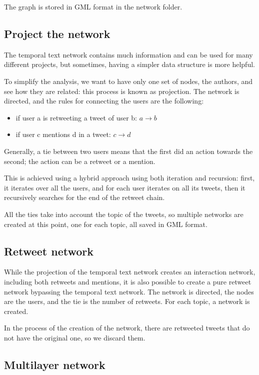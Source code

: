 The graph is stored in GML format in the network folder.

\subsection{Project the network}
The temporal text network contains much information and can be used for many different projects, but sometimes, having a simpler data structure is more helpful.

To simplify the analysis, we want to have only one set of nodes, the authors, and see how they are related: this process is known as projection. The network is directed, and the rules for connecting the users are the following:
\begin{itemize}
    \item if user a is retweeting a tweet of user b: $a \rightarrow  b $
    \item if user c mentions d in a tweet: $ c \rightarrow d $
\end{itemize}


Generally, a tie between two users means that the first did an action towards the second; the action can be a retweet or a mention.

This is achieved using a hybrid approach using both iteration and recursion: first, it iterates over all the users, and for each user iterates on all its tweets, then it recursively searches for the end of the retweet chain.

All the ties take into account the topic of the tweets, so multiple networks are created at this point, one for each topic, all saved in GML format.


\subsection{Retweet network}
While the projection of the temporal text network creates an interaction network, including both retweets and mentions, it is also possible to create a pure retweet network bypassing the temporal text network.
The network is directed, the nodes are the users, and the tie is the number of retweets. For each topic, a network is created.

In the process of the creation of the network, there are retweeted tweets that do not have the original one, so we discard them.

\subsection{Multilayer network}


